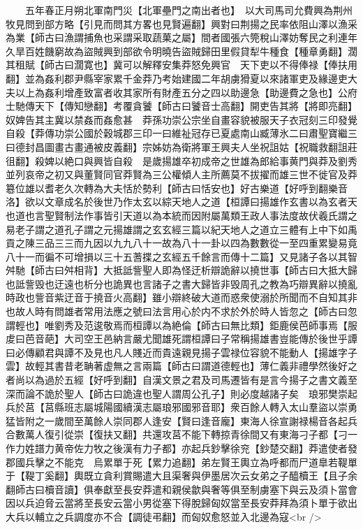 　　五年春正月朔北軍南門災【北軍壘門之南出者也】　以大司馬司允費興為荆州牧見問到部方略【引見而問其方畧也見賢遍翻】興對曰荆揚之民率依阻山澤以漁采為業【師古曰漁謂捕魚也采謂采取蔬菓之屬】間者國張六筦稅山澤妨奪民之利連年久旱百姓饑窮故為盜賊興到部欲令明曉告盜賊歸田里假貸犁牛種食【種章勇翻】濶其租賦【師古曰濶寛也】冀可以解釋安集莽怒免興官　天下吏以不得俸禄【俸扶用翻】並為姦利郡尹縣宰家累千金莽乃考始建國二年胡虜猾夏以來諸軍吏及緣邊吏大夫以上為姦利增產致富者收其家所有財產五分之四以助邊急【助邊費之急也】公府士馳傳天下【傳知戀翻】考覆貪饕【師古曰饕音士高翻】開吏告其將【將即亮翻】奴婢告其主冀以禁姦而姦愈甚　莽孫功崇公宗坐自畫容貌被服天子衣冠刻三印發覺自殺【莽傳功崇公國於穀城郡三印一曰維祉冠存已夏處南山臧薄氷二曰肅聖寶繼三曰德封昌圖畫古畫通被皮義翻】宗姊妨為衛將軍王興夫人坐祝詛姑【祝職救翻詛莊徂翻】殺婢以絶口與興皆自殺　是歲揚雄卒初成帝之世雄為郎給事黄門與莽及劉秀並列哀帝之初又與董賢同官莽賢為三公權傾人主所薦莫不拔擢而雄三世不徙官及莽簒位雄以耆老久次轉為大夫恬於勢利【師古曰恬安也】好古樂道【好呼到翻樂音洛】欲以文章成名於後世乃作太玄以綜天地人之道【桓譚曰揚雄作玄書以為玄者天也道也言聖賢制法作事皆引天道以為本統而因附屬萬類王政人事法度故伏羲氏謂之易老子謂之道孔子謂之元揚雄謂之玄玄經三篇以紀天地人之道立三體有上中下如禹貢之陳三品三三而九因以九九八十一故為八十一卦以四為數數從一至四重累變易竟八十一而徧不可增損以三十五蓍揲之玄經五千餘言而傳十二篇】又見諸子各以其智舛馳【師古曰舛相背】大抵詆訾聖人即為怪迂析辯詭辭以撓世事【師古曰大抵大歸也詆訾毁也迂遠也析分也詭異也言諸子之書大歸皆非毁周孔之教為巧辯異辭以撓亂時政也訾音紫迂音于撓音火高翻】雖小辯終破大道而惑衆使溺於所聞而不自知其非也故人時有問雄者常用法應之號曰法言用心於内不求於外於時人皆忽之【師古曰忽謂輕也】唯劉秀及范逡敬焉而桓譚以為絶倫【師古曰無比類】鉅鹿侯芭師事焉【服䖍曰芭音葩】大司空王邑納言嚴尤聞雄死謂桓譚曰子常稱揚雄書豈能傳於後世乎譚曰必傳顧君與譚不及見也凡人賤近而貴遠親見揚子雲禄位容貌不能動人【揚雄字子雲】故輕其書昔老聃著虚無之言兩篇【師古曰謂道德輕也】薄仁義非禮學然後好之者尚以為過於五經【好呼到翻】自漢文景之君及司馬遷皆有是言今揚子之書文義至深而論不詭於聖人【師古曰詭違也聖人謂周公孔子】則必度越諸子矣　琅邪樊崇起兵於莒【莒縣班志屬城陽國續漢志屬琅邪國邪音耶】衆百餘人轉入太山羣盜以崇勇猛皆附之一歲間至萬餘人崇同郡人逢安【賢曰逢音龐】東海人徐宣謝禄楊音各起兵合數萬人復引從崇【復扶又翻】共還攻莒不能下轉掠青徐間又有東海刁子都【刁一作力姓譜力黄帝佐力牧之後漢有力子都】亦起兵鈔擊徐兖【鈔楚交翻】莽遣使者發郡國兵擊之不能克　烏累單于死【累力追翻】弟左賢王輿立為呼都而尸道臯若鞮單于【鞮丁奚翻】輿既立貪利賞賜遣大且渠奢與伊墨居次云女弟之子醯櫝王【且子余翻師古曰櫝音讀】俱奉獻至長安莽遣和親侯歙與奢等俱至制虜塞下與云及須卜當會因以兵迫脅云當將至長安云當小男從塞下得脫歸匈奴當至長安莽拜為須卜單于欲出大兵以輔立之兵調度亦不合【調徒弔翻】而匈奴愈怒並入北邊為寇<br />
